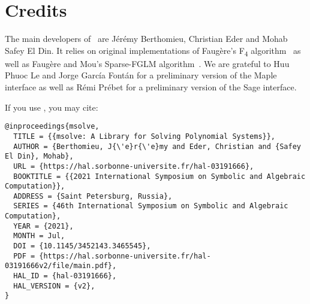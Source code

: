 \documentclass[a4paper,english,11pt]{scrartcl}
\theoremstyle{definition}
\theoremstyle{remark}
\newcommand\Fquatre{\textsc{\texorpdfstring{F\textsubscript{4}}{F4}}\xspace}
\begin{document}
\section{Credits}

The main developers of \msolve~are J\'er\'emy Berthomieu, Christian Eder and
Mohab Safey El Din. It relies on original implementations of Faugère's \Fquatre
algorithm~\cite{F4} as well as Faug\`ere and Mou's Sparse-FGLM
algorithm~\cite{SparseFGLM}. We are grateful to Huu Phuoc Le and Jorge
García Fontán for a 
preliminary version of the Maple interface as well as Rémi Prébet for a
preliminary version of the Sage interface.  

If you use \msolve, you may cite:
\begin{verbatim}
@inproceedings{msolve,
  TITLE = {{msolve: A Library for Solving Polynomial Systems}},
  AUTHOR = {Berthomieu, J{\'e}r{\'e}my and Eder, Christian and {Safey El Din}, Mohab},
  URL = {https://hal.sorbonne-universite.fr/hal-03191666},
  BOOKTITLE = {{2021 International Symposium on Symbolic and Algebraic Computation}},
  ADDRESS = {Saint Petersburg, Russia},
  SERIES = {46th International Symposium on Symbolic and Algebraic Computation},
  YEAR = {2021},
  MONTH = Jul,
  DOI = {10.1145/3452143.3465545},
  PDF = {https://hal.sorbonne-universite.fr/hal-03191666v2/file/main.pdf},
  HAL_ID = {hal-03191666},
  HAL_VERSION = {v2},
}
\end{verbatim}
\renewcommand*{\bibfont}{\small}
  \printbibliography
\end{document}
